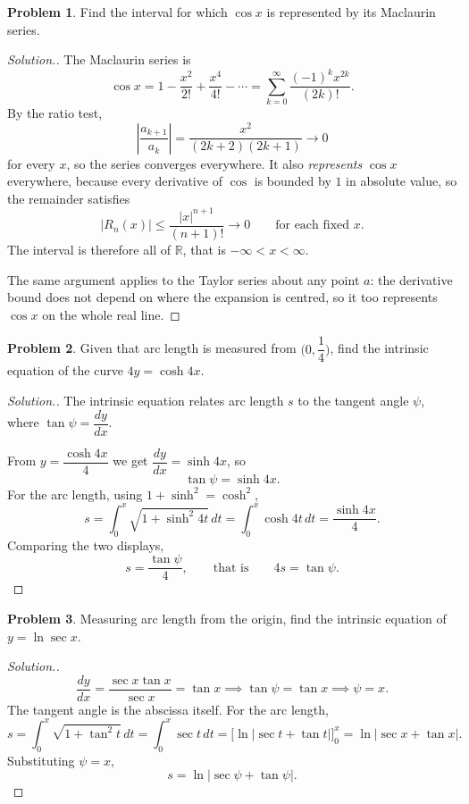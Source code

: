 \documentclass[11pt,a4paper]{article}
\theoremstyle{definition}
\newtheorem{problemx}{Problem}[subsection]
\newenvironment{problem}{\begin{problemx}}{\end{problemx}}
\newenvironment{solution}
  {\renewcommand{\qedsymbol}{}\begin{proof}[\textit{Solution}.]}
  {\end{proof}}
\begin{document}
\begin{problem}
Find the interval for which $\cos x$ is represented by its Maclaurin series.
\end{problem}
\begin{solution}
The Maclaurin series is
$$\cos x = 1 - \frac{x^2}{2!} + \frac{x^4}{4!} - \cdots
= \sum_{k=0}^{\infty}\frac{(-1)^kx^{2k}}{(2k)!} .$$
By the ratio test,
$$\left|\frac{a_{k+1}}{a_k}\right|
= \frac{x^2}{(2k+2)(2k+1)}\longrightarrow 0$$
for every $x$, so the series converges everywhere. It also \emph{represents}
$\cos x$ everywhere, because every derivative of $\cos$ is bounded by $1$ in
absolute value, so the remainder satisfies
$$\left|R_n(x)\right| \leq \frac{\left|x\right|^{n+1}}{(n+1)!}
\longrightarrow 0 \qquad\text{for each fixed }x .$$
The interval is therefore all of $\mathbb{R}$, that is $-\infty<x<\infty$.

The same argument applies to the Taylor series about any point $a$: the
derivative bound does not depend on where the expansion is centred, so it too
represents $\cos x$ on the whole real line.
\end{solution}

\begin{problem}
Given that arc length is measured from $\Big(0,\dfrac14\Big)$, find the
intrinsic equation of the curve $4y = \cosh 4x$.
\end{problem}
\begin{solution}
The intrinsic equation relates arc length $s$ to the tangent angle $\psi$, where
$\tan\psi = \dfrac{dy}{dx}$.

From $y = \dfrac{\cosh 4x}{4}$ we get $\dfrac{dy}{dx} = \sinh 4x$, so
$$\tan\psi = \sinh 4x .$$
For the arc length, using $1 + \sinh^2 = \cosh^2$,
$$s = \int_0^x\sqrt{1 + \sinh^2 4t}\,dt = \int_0^x\cosh 4t\,dt
= \frac{\sinh 4x}{4}.$$
Comparing the two displays,
$$s = \frac{\tan\psi}{4}, \qquad\text{that is}\qquad 4s = \tan\psi .$$
\end{solution}

\begin{problem}
Measuring arc length from the origin, find the intrinsic equation of
$y = \ln\sec x$.
\end{problem}
\begin{solution}
$$\frac{dy}{dx} = \frac{\sec x\tan x}{\sec x} = \tan x
\implies \tan\psi = \tan x \implies \psi = x .$$
The tangent angle is the abscissa itself. For the arc length,
$$s = \int_0^x\sqrt{1+\tan^2 t}\,dt = \int_0^x\sec t\,dt
= \Big[\ln\left|\sec t + \tan t\right|\Big]_0^x
= \ln\left|\sec x + \tan x\right| .$$
Substituting $\psi = x$,
$$s = \ln\left|\sec\psi + \tan\psi\right| .$$
\end{solution}
\end{document}
